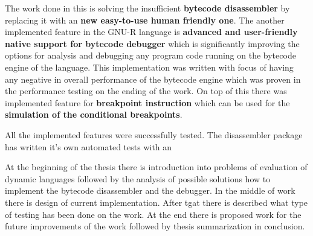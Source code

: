 \documentclass[thesis=M,english]{FITthesis}[2018/10/20]
\begin{document}
The work done in this is solving the insufficient \textbf{bytecode disassembler} by replacing it with an \textbf{new easy-to-use human friendly one}. The another implemented feature in the GNU-R language is \textbf{advanced and user-friendly native support for bytecode debugger} which is significantly improving the options for analysis and debugging any program code running on the bytecode engine of the language. This implementation was written with focus of having any negative in overall performance of the bytecode engine which was proven in the performance testing on the ending of the work. On top of this there was implemented feature for \textbf{breakpoint instruction} which can be used for the \textbf{simulation of the conditional breakpoints}.

All the implemented features were successfully tested. The disassembler package has written it's own automated tests with an

At the beginning of the thesis there is introduction into problems of evaluation of dynamic languages followed by the analysis of possible solutions how to implement the bytecode disassembler and the debugger. In the middle of work there is design of current implementation. After tgat there is described what type of testing has been done on the work. At the end there is proposed work for the future improvements of the work followed by thesis summarization in conclusion.




\end{document}
